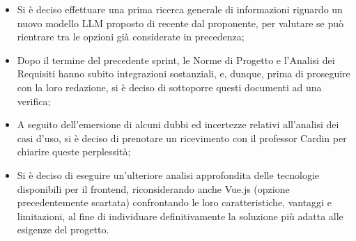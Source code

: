 \begin{itemize}
    \item Si è deciso effettuare una prima ricerca generale di informazioni riguardo un nuovo modello LLM proposto di recente dal proponente, per valutare se può rientrare tra le opzioni già considerate in precedenza;
    \item Dopo il termine del precedente sprint, le Norme di Progetto e l'Analisi dei Requisiti hanno subito integrazioni sostanziali, e, dunque, prima di proseguire con la loro redazione, si è deciso di sottoporre questi documenti ad una verifica;
    \item A seguito dell'emersione di alcuni dubbi ed incertezze relativi all'analisi dei casi d'uso, si è deciso di prenotare un ricevimento con il professor Cardin per chiarire queste perplessità;
    \item Si è deciso di eseguire un'ulteriore analisi approfondita delle tecnologie disponibili per il frontend, riconsiderando anche Vue.js (opzione precedentemente scartata) confrontando le loro caratteristiche, vantaggi e limitazioni, al fine di individuare definitivamente la soluzione più adatta alle esigenze del progetto.
\end{itemize}